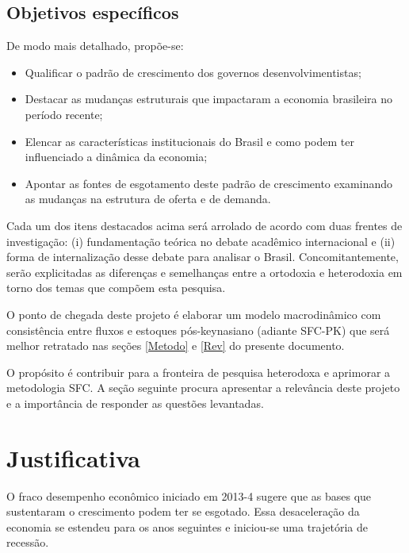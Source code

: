 \documentclass[12pt]{report}
\begin{document}
\section{Objetivos específicos}

De modo mais detalhado, propõe-se:

\begin{itemize}
	\item Qualificar o padrão de crescimento dos governos desenvolvimentistas;
	\item Destacar as mudanças estruturais que impactaram a economia brasileira no período recente;
	\item Elencar as características institucionais do Brasil e como podem ter influenciado a dinâmica da economia;
	\item Apontar as fontes de esgotamento deste padrão de crescimento examinando as mudanças na estrutura de oferta e de demanda.
\end{itemize} 

Cada um dos itens destacados acima será arrolado de acordo com duas frentes de investigação: (i) fundamentação teórica no debate acadêmico internacional e 
(ii) forma de internalização desse debate  para analisar o Brasil. %
Concomitantemente, serão explicitadas as diferenças e semelhanças entre a ortodoxia e heterodoxia em torno dos temas que compõem esta pesquisa.


O ponto de chegada deste projeto é elaborar um modelo macrodinâmico com consistência entre fluxos e estoques pós-keynasiano (adiante SFC-PK) que será melhor retratado nas seções \ref{Metodo} e \ref{Rev} do presente documento. 

O propósito é contribuir para a fronteira de pesquisa heterodoxa e aprimorar a metodologia SFC. 
A seção seguinte procura apresentar a relevância deste projeto e a importância de responder as questões levantadas.

{\let\clearpage\relax \chapter{Justificativa}\label{Just}}


O fraco desempenho econômico iniciado em 2013-4  sugere que as bases que sustentaram o crescimento podem ter se esgotado. Essa desaceleração da economia se estendeu para os anos seguintes e iniciou-se uma trajetória de recessão. 
\end{document}
